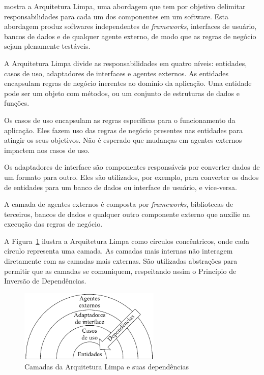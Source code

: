 \cite{clean-arch-book} mostra a Arquitetura Limpa, uma abordagem que tem por objetivo delimitar responsabilidades para cada um dos componentes em um software.
Esta abordagem produz softwares independentes de \emph{frameworks}, interfaces de usuário, bancos de dados e de qualquer agente externo, de modo que as regras de negócio sejam plenamente testáveis.

A Arquitetura Limpa divide as responsabilidades em quatro níveis: entidades, casos de uso, adaptadores de interfaces e agentes externos.
As entidades encapsulam regras de negócio inerentes ao domínio da aplicação.
Uma entidade pode ser um objeto com métodos, ou um conjunto de estruturas de dados e funções.

Os casos de uso encapsulam as regras específicas para o funcionamento da aplicação.
Eles fazem uso das regras de negócio presentes nas entidades para atingir os seus objetivos.
Não é esperado que mudanças em agentes externos impactem nos casos de uso.

Os adaptadores de interface são componentes responsáveis por converter dados de um formato para outro.
Eles são utilizados, por exemplo, para converter os dados de entidades para um banco de dados ou interface de usuário, e vice-versa.

A camada de agentes externos é composta por \emph{frameworks}, bibliotecas de terceiros, bancos de dados e qualquer outro componente externo que auxilie na execução das regras de negócio.

A Figura~\ref{fig:clean_arch_circles} ilustra a Arquitetura Limpa como círculos concêntricos, onde cada círculo representa uma camada.
As camadas mais internas não interagem diretamente com as camadas mais externas.
São utilizadas abstrações para permitir que as camadas se comuniquem, respeitando assim o Princípio de Inversão de Dependências.

\begin{figure}[ht]
	\centering
	\includegraphics[width=0.6\textwidth]{images/clean_arch_circles.png}
	\caption{Camadas da Arquitetura Limpa e suas dependências}
	\label{fig:clean_arch_circles}
\end{figure}